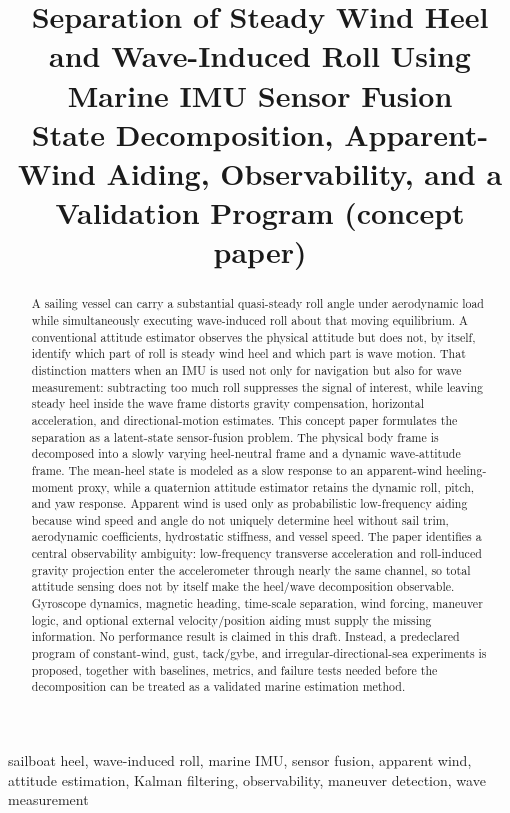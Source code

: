\documentclass[conference]{IEEEtran}
\title{Separation of Steady Wind Heel and Wave-Induced Roll Using Marine IMU Sensor Fusion\\
\large State Decomposition, Apparent-Wind Aiding, Observability, and a Validation Program (concept paper)}
\author{%
  \IEEEauthorblockN{Mikhail S. Grushinskiy}
  \IEEEauthorblockA{Independent Researcher, USA, Fair Lawn\\
  Bareboat Necessities GitHub Project\\
  Email: mgrouch@users.github.com}%
}
\begin{document}
\maketitle

\begin{abstract}
A sailing vessel can carry a substantial quasi-steady roll angle under aerodynamic
load while simultaneously executing wave-induced roll about that moving equilibrium.
A conventional attitude estimator observes the physical attitude but does not, by
itself, identify which part of roll is steady wind heel and which part is wave motion.
That distinction matters when an IMU is used not only for navigation but also for wave
measurement: subtracting too much roll suppresses the signal of interest, while leaving
steady heel inside the wave frame distorts gravity compensation, horizontal acceleration,
and directional-motion estimates. This concept paper formulates the separation as a
latent-state sensor-fusion problem. The physical body frame is decomposed into a slowly
varying heel-neutral frame and a dynamic wave-attitude frame. The mean-heel state is
modeled as a slow response to an apparent-wind heeling-moment proxy, while a quaternion
attitude estimator retains the dynamic roll, pitch, and yaw response. Apparent wind is
used only as probabilistic low-frequency aiding because wind speed and angle do not
uniquely determine heel without sail trim, aerodynamic coefficients, hydrostatic
stiffness, and vessel speed. The paper identifies a central observability ambiguity:
low-frequency transverse acceleration and roll-induced gravity projection enter the
accelerometer through nearly the same channel, so total attitude sensing does not by
itself make the heel/wave decomposition observable. Gyroscope dynamics, magnetic
heading, time-scale separation, wind forcing, maneuver logic, and optional external
velocity/position aiding must supply the missing information. No performance result is
claimed in this draft. Instead, a predeclared program of constant-wind, gust, tack/gybe,
and irregular-directional-sea experiments is proposed, together with baselines, metrics,
and failure tests needed before the decomposition can be treated as a validated marine
estimation method.
\end{abstract}

\begin{IEEEkeywords}
sailboat heel, wave-induced roll, marine IMU, sensor fusion, apparent wind, attitude
estimation, Kalman filtering, observability, maneuver detection, wave measurement
\end{IEEEkeywords}
\end{document}
